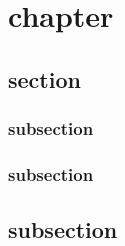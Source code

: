 \chapter{chapter}
\section{section}
\subsection{subsection}
\subsection{subsection}
\section{subsection}
